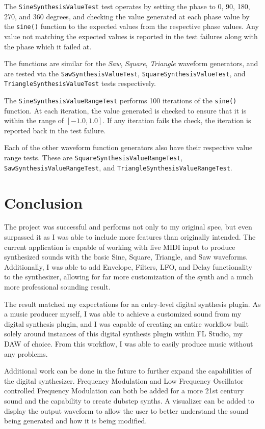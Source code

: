 \documentclass[a4paper,12pt]{report}
\begin{document}
The \texttt{Sine\-Synthesis\-Value\-Test} test operates by setting the phase to 0, 90, 180, 270, and 360 degrees, and checking the value generated at each phase value by the \texttt{sine()} function to the expected values from the respective phase values. Any value not matching the expected values is reported in the test failures along with the phase which it failed at.

The functions are similar for the \emph{Saw}, \emph{Square}, \emph{Triangle} waveform generators, and are tested via the \texttt{Saw\-Synthesis\-Value\-Test}, \texttt{Square\-Synthesis\-Value\-Test}, and \texttt{Triangle\-Synthesis\-Value\-Test} tests respectively.

The \texttt{Sine\-Synthesis\-Value\-Range\-Test} performs 100 iterations of the \texttt{sine()} function. At each iteration, the value generated is checked to ensure that it is within the range of $[-1.0,1.0]$. If any iteration fails the check, the iteration is reported back in the test failure.

Each of the other waveform function generators also have their respective value range tests. These are \texttt{Square\-Synthesis\-Value\-Range\-Test}, \texttt{Saw\-Synthesis\-Value\-Range\-Test}, and \texttt{Triangle\-Synthesis\-Value\-Range\-Test}.

\chapter{Conclusion}
\label{chapter:results}
The project was successful and performs not only to my original spec, but even surpassed it as I was able to include more features than originally intended. The current application is capable of working with live MIDI input to produce synthesized sounds with the basic Sine, Square, Triangle, and Saw waveforms. Additionally, I was able to add Envelope, Filters, LFO, and Delay functionality to the synthesizer, allowing for far more customization of the synth and a much more professional sounding result. 

The result matched my expectations for an entry-level digital synthesis plugin. As a music producer myself, I was able to achieve a customized sound from my digital synthesis plugin, and I was capable of creating an entire workflow built solely around instances of this digital synthesis plugin within FL Studio, my DAW of choice. From this workflow, I was able to easily produce music without any problems.

Additional work can be done in the future to further expand the capabilities of the digital synthesizer. Frequency Modulation and Low Frequency Oscillator controlled Frequency Modulation can both be added for a more 21st century sound and the capability to create dubstep synths. A visualizer can be added to display the output waveform to allow the user to better understand the sound being generated and how it is being modified.
\end{document}
